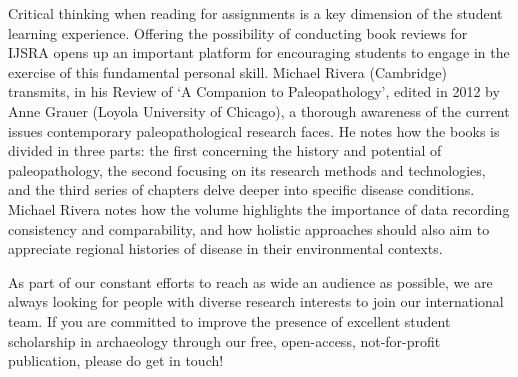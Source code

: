 Critical thinking when reading for assignments is a key dimension of the student learning experience. Offering the possibility of conducting book reviews for IJSRA opens up an important platform for encouraging students to engage in the exercise of this fundamental personal skill. Michael Rivera (Cambridge) transmits, in his Review of ‘A Companion to Paleopathology’, edited in 2012 by Anne Grauer (Loyola University of Chicago), a thorough awareness of the current issues contemporary paleopathological research faces. He notes how the books is divided in three parts: the first concerning the history and potential of paleopathology, the second focusing on its research methods and technologies, and the third series of chapters delve deeper into specific disease conditions. Michael Rivera notes how the volume highlights the importance of data recording consistency and comparability, and how holistic approaches should also aim to appreciate regional histories of disease in their environmental contexts.


As part of our constant efforts to reach as wide an audience as possible, we are always looking for people with diverse research interests to join our international team. If you are committed to improve the presence of excellent student scholarship in archaeology through our free, open-access, not-for-profit publication, please do get in touch!
\IJSRAclosing%